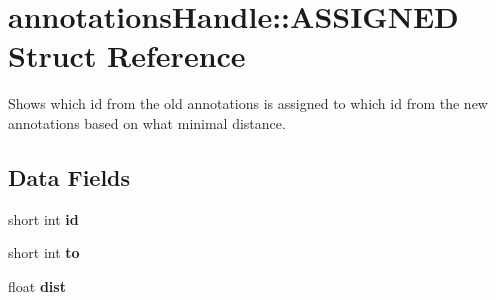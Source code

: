 \hypertarget{structannotationsHandle_1_1ASSIGNED}{
\section{annotationsHandle::ASSIGNED Struct Reference}
\label{structannotationsHandle_1_1ASSIGNED}
}


Shows which id from the old annotations is assigned to which id from the new annotations based on what minimal distance.  


\subsection*{Data Fields}
\begin{DoxyCompactItemize}
\item 
\hypertarget{structannotationsHandle_1_1ASSIGNED_a4ddebd766a76758ce4466a465aeed90b}{
short int {\bfseries id}}
\label{structannotationsHandle_1_1ASSIGNED_a4ddebd766a76758ce4466a465aeed90b}

\item 
\hypertarget{structannotationsHandle_1_1ASSIGNED_afe51e2b74eb7c0a72c5380591086003a}{
short int {\bfseries to}}
\label{structannotationsHandle_1_1ASSIGNED_afe51e2b74eb7c0a72c5380591086003a}

\item 
\hypertarget{structannotationsHandle_1_1ASSIGNED_a2578b368dad74bcd4a88bbeeb319a833}{
float {\bfseries dist}}
\label{structannotationsHandle_1_1ASSIGNED_a2578b368dad74bcd4a88bbeeb319a833}

\end{DoxyCompactItemize}
